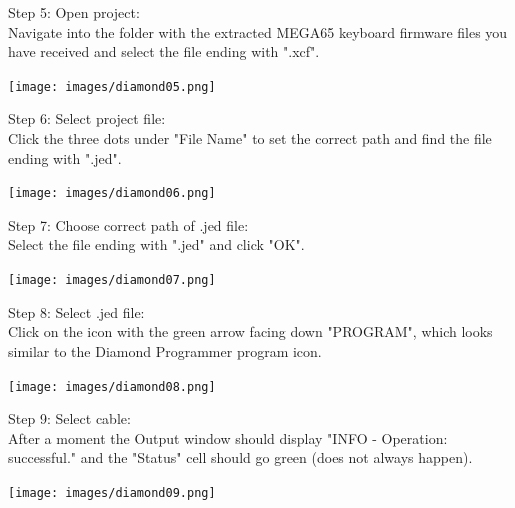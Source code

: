 \begin{minipage}{\linewidth}
Step 5: Open project: \\
Navigate into the folder with the extracted MEGA65 keyboard
firmware files you have received and select the file ending with ".xcf".
  \begin{center}
  \texttt{[image: images/diamond05.png]}
  \end{center}
\end{minipage}

\vspace{5mm}

\begin{minipage}{\linewidth}
Step 6: Select project file: \\
Click the three dots under "File Name" to set the correct
path and find the file ending with ".jed".
  \begin{center}
  \texttt{[image: images/diamond06.png]}
  \end{center}
\end{minipage}


\begin{minipage}{\linewidth}
Step 7: Choose correct path of .jed file: \\
Select the file ending with ".jed" and click "OK".
  \begin{center}
  \texttt{[image: images/diamond07.png]}
  \end{center}
\end{minipage}

\vspace{5mm}

\begin{minipage}{\linewidth}
  Step 8: Select .jed file: \\
Click on the icon with the green arrow facing down "PROGRAM",
which looks similar to the Diamond Programmer program icon.
  \begin{center}
  \texttt{[image: images/diamond08.png]}
  \end{center}
\end{minipage}


\begin{minipage}{\linewidth}
Step 9: Select cable: \\
After a moment the Output window should display
"INFO - Operation: successful." and the "Status" cell should
go green (does not always happen).
  \begin{center}
  \texttt{[image: images/diamond09.png]}
  \end{center}
\end{minipage}

